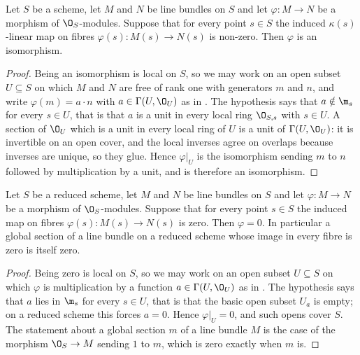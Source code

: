 \begin{lemma}
\label{lem:cube-invertible-fibrewise}
\leanok
Let $S$ be a scheme, let $M$ and $N$ be line bundles on $S$ and let
$\varphi\colon M\to N$ be a morphism of $\O_S$-modules.  Suppose that for
every point $s\in S$ the induced $\kappa(s)$-linear map on fibres
$\varphi(s)\colon M(s)\to N(s)$ is non-zero.  Then $\varphi$ is an
isomorphism.
\end{lemma}
\begin{proof}
\leanok
Being an isomorphism is local on $S$, so we may work on an open subset
$U\subseteq S$ on which $M$ and $N$ are free of rank one with generators $m$
and $n$, and write $\varphi(m)=a\cdot n$ with $a\in\Gamma(U,\O_U)$ as in
.  The hypothesis says that
$a\notin\m_s$ for every $s\in U$, that is that $a$ is a unit in every local
ring $\O_{S,s}$ with $s\in U$.  A section of $\O_U$ which is a unit in every
local ring of $U$ is a unit of $\Gamma(U,\O_U)$: it is invertible on an open
cover, and the local inverses agree on overlaps because inverses are unique,
so they glue.  Hence $\varphi|_U$ is the isomorphism sending $m$ to $n$
followed by multiplication by a unit, and is therefore an isomorphism.
\end{proof}

\begin{lemma}\label{lem:cube-vanishing-fibrewise}
\leanok
Let $S$ be a reduced scheme, let $M$ and $N$ be line bundles on $S$ and let
$\varphi\colon M\to N$ be a morphism of $\O_S$-modules.  Suppose that for
every point $s\in S$ the induced map on fibres $\varphi(s)\colon M(s)\to N(s)$
is zero.  Then $\varphi=0$.  In particular a global section of a line bundle
on a reduced scheme whose image in every fibre is zero is itself zero.
\end{lemma}
\begin{proof}
\leanok
Being zero is local on $S$, so we may work on an open subset $U\subseteq S$ on
which $\varphi$ is multiplication by a function $a\in\Gamma(U,\O_U)$ as in
.  The hypothesis says that $a$ lies in
$\m_s$ for every $s\in U$, that is that the basic open subset $U_a$ is empty;
on a reduced scheme this forces $a=0$.  Hence $\varphi|_U=0$, and such opens
cover $S$.  The statement about a global section $m$ of a line bundle $M$ is
the case of the morphism $\O_S\to M$ sending $1$ to $m$, which is zero exactly
when $m$ is.
\end{proof}

